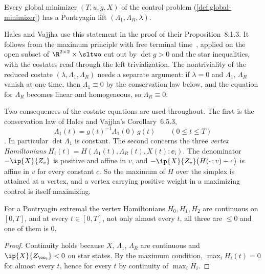 \begin{theorem}\label{thm:pmp-lift}
Every global minimizer $(T,u,g,X)$ of the control problem (\cref{def:global-minimizer}) has a
Pontryagin lift $(\Lambda_1,\Lambda_R,\lambda)$.
\end{theorem}

Hales and Vajjha use this statement in the proof of their Proposition~8.1.3. It follows from the
maximum principle with free terminal time~\cite{Pontryagin1962,AgrachevSachkov2004}, applied on the
open subset of $\R^{2\times2}\times\sltwo$ cut out by $\det g>0$ and the star inequalities, with
the costates read through the left trivialization. The nontriviality of the reduced costate
$(\lambda,\Lambda_1,\Lambda_R)$ needs a separate argument: if $\lambda=0$ and $\Lambda_1$,
$\Lambda_R$ vanish at one time, then $\Lambda_1\equiv0$ by the conservation law below, and the
equation for $\Lambda_R$ becomes linear and homogeneous, so $\Lambda_R\equiv0$.

Two consequences of the costate equations are used throughout. The first is the conservation law
of Hales and Vajjha's Corollary~6.5.3,
\begin{equation}\label{red:conservation}
\Lambda_1(t)=g(t)^{-1}\Lambda_1(0)\,g(t)\qquad(0\le t\le T)
\end{equation}. In particular $\det\Lambda_1$ is constant. The second
concerns the three \emph{vertex Hamiltonians} $H_i(t)=H(\Lambda_1(t),\Lambda_R(t),X(t);\ee_i)$.
The denominator $-\ip{X}{Z_v}$ is positive and affine in $v$, and
$-\ip{X}{Z_v}\bigl(H(\cdot\,;v)-c\bigr)$ is affine in $v$ for every constant $c$. So the maximum of
$H$ over the simplex is attained at a vertex, and a vertex carrying positive weight in a maximizing
control is itself maximizing.

\begin{lemma}\label{lem:vertex-hamiltonians}
For a Pontryagin extremal the vertex Hamiltonians $H_0,H_1,H_2$ are continuous on $[0,T]$, and at
every $t\in[0,T]$, not only almost every $t$, all three are $\le0$ and one of them is $0$.
\end{lemma}

\begin{proof}
Continuity holds because $X$, $\Lambda_1$, $\Lambda_R$ are continuous and $\ip{X}{Z_{\ee_i}}<0$ on
star states. By the maximum condition, $\max_iH_i(t)=0$ for almost every $t$, hence for every $t$
by continuity of $\max_iH_i$.
\end{proof}

